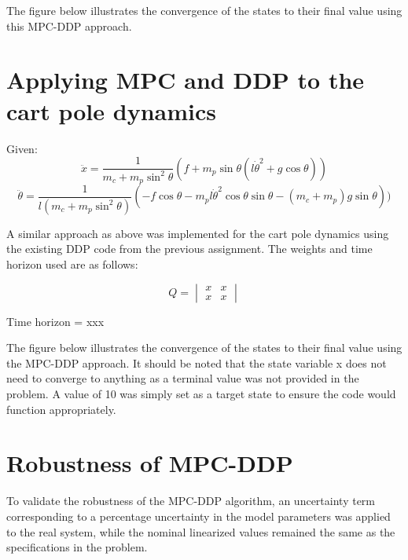 \documentclass{article}
\begin{document}
The figure below illustrates the convergence of the states to their final value using this MPC-DDP approach.

\section{Applying MPC and DDP to the cart pole dynamics}

Given:
\begin{equation}
\ddot{x} = \frac{1}{m_c + m_p{\sin}^2\theta}(f + m_p \sin\theta(l{\dot{\theta}}^2 + g\cos\theta))
\end{equation}
\begin{equation}
\ddot{\theta} = \frac{1}{l(m_c + m_p{\sin}^2{\theta})}(-f\cos\theta - m_pl{\dot{\theta}}^2\cos{\theta}\sin{\theta} - (m_c + m_p)g\sin\theta))
\end{equation}


A similar approach as above was implemented for the cart pole dynamics using 		the existing DDP code from the previous assignment. The weights and time 			horizon used are as follows:

$$
Q = 
\begin{vmatrix}
x & x \\ x & x
\end{vmatrix}
$$

\begin{center}
Time horizon = xxx
\end{center}

The figure below illustrates the convergence of the states to their final value using the MPC-DDP approach. It should be noted that the state variable x does not need to converge to anything as a terminal value was not provided in the problem. A value of 10 was simply set as a target state to ensure the code would function appropriately.

\section{Robustness of MPC-DDP}

To validate the robustness of the MPC-DDP algorithm, an uncertainty term corresponding to a percentage uncertainty in the model parameters was applied to the real system, while the nominal linearized values remained the same as the specifications in the problem.
\end{document}
